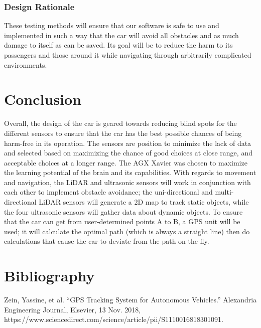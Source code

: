 \documentclass[onecolumn, draftclsnofoot, 10pt, compsoc]{IEEEtran}
\begin{document}
\subsubsection{Design Rationale}

These testing methods will ensure that our software is safe to use and implemented in such a way that the car will avoid all obstacles and as much damage to itself as can be saved. Its goal will be to reduce the harm to its passengers and those around it while navigating through arbitrarily complicated environments. 

\section{Conclusion}

Overall, the design of the car is geared towards reducing blind spots for the different sensors to ensure that the car has the best possible chances of being harm-free in its operation. The sensors are position to minimize the lack of data and selected based on maximizing the chance of good choices at close range, and acceptable choices at a longer range. The AGX Xavier was chosen to maximize the learning potential of the brain and its capabilities. With regards to movement and navigation, the LiDAR and ultrasonic sensors will work in conjunction with each other to implement obstacle avoidance; the uni-directional and multi-directional LiDAR sensors will generate a 2D map to track static objects, while the four ultrasonic sensors will gather data about dynamic objects. To ensure that the car can get from user-determined points A to B, a GPS unit will be used; it will calculate the optimal path (which is always a straight line) then do calculations that cause the car to deviate from the path on the fly.


\section{Bibliography}

\printbibliography[]
\noindent[4]\indent Zein, Yassine, et al. “GPS Tracking System for Autonomous Vehicles.” Alexandria Engineering Journal, Elsevier, 13 Nov. 2018, https://www.sciencedirect.com/science/article/pii/S1110016818301091.
\end{document}
